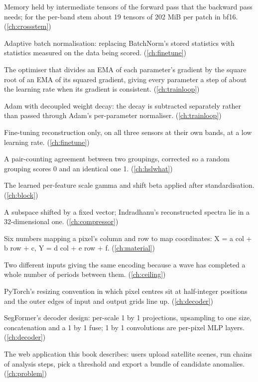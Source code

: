 \begin{description}[style=nextline,leftmargin=1.2em,font=\normalfont\bfseries]
\item[Activation memory] Memory held by intermediate tensors of the forward pass that the backward pass needs; for the per-band stem about 19 tensors of 202 MiB per patch in bf16. (\cref{ch:crossstem})
\item[AdaBN] Adaptive batch normalisation: replacing BatchNorm's stored statistics with statistics measured on the data being scored. (\cref{ch:finetune})
\item[Adam] The optimiser that divides an EMA of each parameter's gradient by the square root of an EMA of its squared gradient, giving every parameter a step of about the learning rate when its gradient is consistent. (\cref{ch:trainloop})
\item[AdamW] Adam with decoupled weight decay: the decay is subtracted separately rather than passed through Adam's per-parameter normaliser. (\cref{ch:trainloop})
\item[Adapt stage] Fine-tuning reconstruction only, on all three sensors at their own bands, at a low learning rate. (\cref{ch:finetune})
\item[Adjusted Rand index] A pair-counting agreement between two groupings, corrected so a random grouping scores 0 and an identical one 1. (\cref{ch:hslwhat})
\item[Affine map (LayerNorm)] The learned per-feature scale gamma and shift beta applied after standardisation. (\cref{ch:block})
\item[Affine subspace] A subspace shifted by a fixed vector; Indradhanu's reconstructed spectra lie in a 32-dimensional one. (\cref{ch:compressor})
\item[Affine transform] Six numbers mapping a pixel's column and row to map coordinates: X = a col + b row + c, Y = d col + e row + f. (\cref{ch:material})
\item[Aliasing] Two different inputs giving the same encoding because a wave has completed a whole number of periods between them. (\cref{ch:ceiling})
\item[align\_corners=False] PyTorch's resizing convention in which pixel centres sit at half-integer positions and the outer edges of input and output grids line up. (\cref{ch:decoder})
\item[All-MLP decoder] SegFormer's decoder design: per-scale 1 by 1 projections, upsampling to one size, concatenation and a 1 by 1 fuse; 1 by 1 convolutions are per-pixel MLP layers. (\cref{ch:decoder})
\item[Allotrope] The web application this book describes: users upload satellite scenes, run chains of analysis steps, pick a threshold and export a bundle of candidate anomalies. (\cref{ch:problem})

\end{description}
